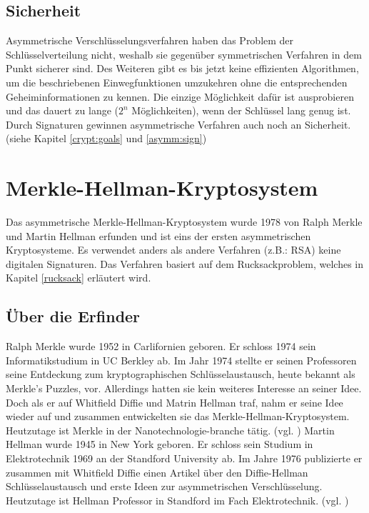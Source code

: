 \documentclass[a4paper,12pt,titlepage]{article}
\begin{document}
\subsection{Sicherheit} %
Asymmetrische Verschlüsselungsverfahren haben das Problem der Schlüsselverteilung nicht, weshalb sie gegenüber symmetrischen Verfahren in dem Punkt sicherer sind. Des Weiteren gibt es bis jetzt keine effizienten Algorithmen, um die beschriebenen Einwegfunktionen umzukehren ohne die entsprechenden Geheiminformationen zu kennen. Die einzige Möglichkeit dafür ist ausprobieren und das dauert zu lange ($2^{n}$ Möglichkeiten), wenn der Schlüssel lang genug ist. Durch Signaturen gewinnen asymmetrische Verfahren auch noch an Sicherheit. (siehe Kapitel \ref{crypt:goals} und \ref{asymm:sign})



\section{Merkle-Hellman-Kryptosystem}\label{mhk}
Das asymmetrische Merkle-Hellman-Kryptosystem wurde 1978 von Ralph Merkle und Martin Hellman erfunden und ist eins der ersten asymmetrischen Kryptosysteme. Es verwendet anders als andere Verfahren (z.B.: RSA) keine digitalen Signaturen. Das Verfahren basiert auf dem Rucksackproblem, welches in Kapitel \ref{rucksack} erläutert wird.

\subsection{Über die Erfinder}
Ralph Merkle wurde 1952 in Carlifornien geboren. Er schloss 1974 sein Informatikstudium in UC Berkley ab. Im Jahr 1974 stellte er seinen Professoren seine Entdeckung zum kryptographischen Schlüsselaustausch, heute bekannt als Merkle's Puzzles, vor. Allerdings hatten sie kein weiteres Interesse an seiner Idee. Doch als er auf Whitfield Diffie und Matrin Hellman traf, nahm er seine Idee wieder auf und zusammen entwickelten sie das Merkle-Hellman-Kryptosystem. Heutzutage ist Merkle in der Nanotechnologie-branche tätig. (vgl. \cite{ralph_bio})  \newline Martin Hellman wurde 1945 in New York geboren. Er schloss sein Studium in Elektrotechnik 1969 an der Standford University ab. Im Jahre 1976 publizierte er zusammen mit Whitfield Diffie einen Artikel über den Diffie-Hellman Schlüsselaustausch und erste Ideen zur asymmetrischen Verschlüsselung. Heutzutage ist Hellman Professor in Standford im Fach Elektrotechnik. (vgl. \cite{martin_bio})
\end{document}
